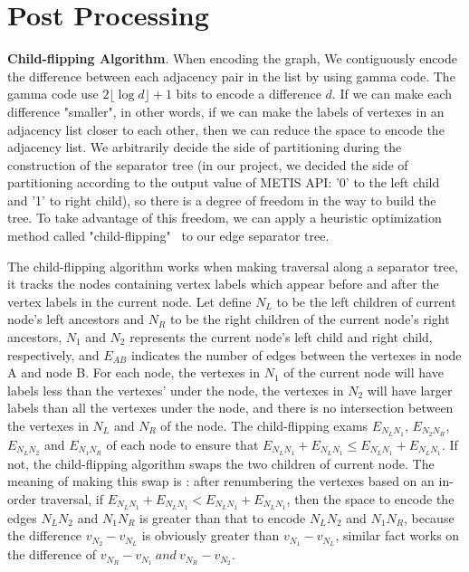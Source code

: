 \documentclass[12pt,glossary]{dalthesis}
\begin{document}
\section{Post Processing}

\textbf{Child-flipping Algorithm}. When encoding the graph, We contiguously encode the difference between each adjacency pair in the list by using gamma code. The gamma code use $2\lfloor \log d \rfloor + 1$ bits to encode a difference $d$. If we can make each difference "smaller", in other words, if we can make the labels of vertexes in an adjacency list closer to each other, then we can reduce the space to encode the adjacency list. We arbitrarily decide the side of partitioning during the construction of the separator tree (in our project, we decided the side of partitioning according to the output value of METIS API: '0' to the left child and '1' to right child), so there is a degree of freedom in the way to build the tree. To take advantage of this freedom, we can apply a heuristic optimization method called "child-flipping"~\cite{compact-representation} to our edge separator tree.

\bigskip
\bigskip

The child-flipping algorithm works when making traversal along a separator tree, it tracks the nodes containing vertex labels which appear before and after the vertex labels in the current node. Let define $N_{L}$ to be the left children of current node's left ancestors and $N_{R}$ to be the right children of the current node's right ancestors, $N_{1}$ and $N_{2}$ represents the current node's left child and right child, respectively, and $E_{AB}$ indicates the number of edges between the vertexes in node A and node B. For each node, the vertexes in $N_{1}$ of the current node will have labels less than the vertexes' under the node, the vertexes in $N_{2}$ will have larger labels than all the vertexes under the node, and there is no intersection between the vertexes in $N_{L}$ and $N_{R}$ of the node. The child-flipping exams $E_{N_{L}N_{1}}$, $E_{N_{2}N_{R}}$, $E_{N_{L}N_{2}}$ and $E_{N_{1}N_{R}}$ of each node to ensure that $E_{N_{L}N_{1}} + E_{N_{L}N_{1}} \leq E_{N_{L}N_{1}} + E_{N_{L}N_{1}}$. If not, the child-flipping algorithm swaps the two children of current node. The meaning of making this swap is : after renumbering the vertexes based on an in-order traversal, if $E_{N_{L}N_{1}} + E_{N_{L}N_{1}} < E_{N_{L}N_{1}} + E_{N_{L}N_{1}}$, then the space to encode the edges $N_{L}N_{2}$ and $N_{1}N_{R}$ is greater than that to encode $N_{L}N_{2}$ and $N_{1}N_{R}$, because the difference $v_{N_{2}} -v_{N_{L}}$ is obviously greater than $v_{N_{1}} - v_{N_{L}}$, similar fact works on the difference of $v_{N_{R}}-v_{N_{1}} \  and \  v_{N_{R}}-v_{N_{2}}$.
\end{document}
